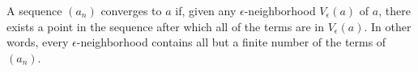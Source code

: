 \begin{tcolorbox}%
    [rounded corners, colframe=xred, colback=xred!15, coltitle=white, label=def:2.2.3B, title={\large \textbf{Definition 2.2.3B}}]
    A sequence \( (a_n) \) converges to \( a \) if, given any \( \epsilon \)-neighborhood \( V_\epsilon(a) \) of \( a \), there exists a point in the sequence after which all of the terms are in \( V_\epsilon(a) \). In other words, every \( \epsilon \)-neighborhood contains all but a finite number of the terms of \( (a_n) \).
\end{tcolorbox}